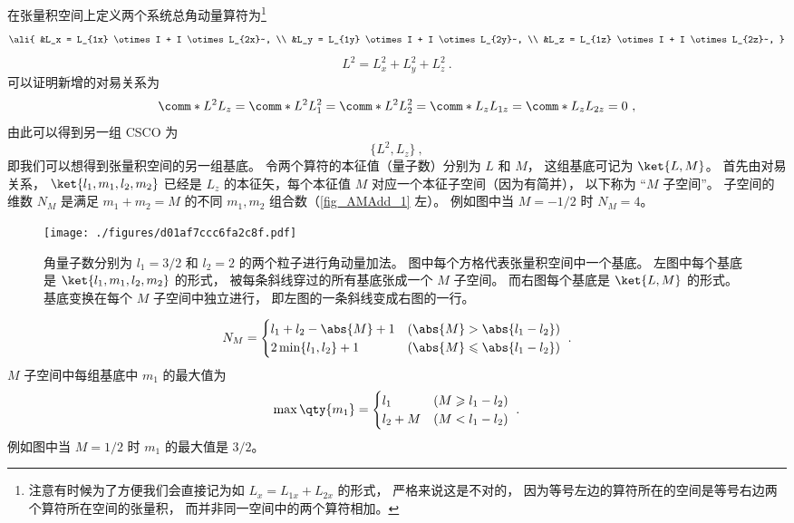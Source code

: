 在张量积空间上定义两个系统总角动量算符为\footnote{注意有时候为了方便我们会直接记为如 $L_x = L_{1x} + L_{2x}$ 的形式， 严格来说这是不对的， 因为等号左边的算符所在的空间是等号右边两个算符所在空间的张量积， 而并非同一空间中的两个算符相加。}
\begin{equation}\ali{
&L_x = L_{1x} \otimes I +  I \otimes L_{2x}~, \\
&L_y = L_{1y} \otimes I +  I \otimes L_{2y}~, \\
&L_z = L_{1z} \otimes I +  I \otimes L_{2z}~,
}\end{equation}
\begin{equation}
L^2 = L_x^2 + L_y^2 + L_z^2~.
\end{equation}
可以证明新增的对易关系为
\begin{equation}
\comm*{L^2}{L_z} = \comm*{L^2}{L_1^2} = \comm*{L^2}{L_2^2} = 
\comm*{L_z}{L_{1z}} = \comm*{L_z}{L_{2z}} = 0~,
\end{equation}
由此可以得到另一组 CSCO 为 %
\begin{equation}
\{L^2, L_z\}~,
\end{equation}
即我们可以想得到张量积空间的另一组基底。 令两个算符的本征值（量子数）分别为 $L$  和 $M$， 这组基底可记为 $\ket{L, M}$。  首先由对易关系， $\ket{l_1, m_1, l_2, m_2}$ 已经是 $L_z$ 的本征矢，每个本征值 $M$ 对应一个本征子空间（因为有简并）， 以下称为 “$M$ 子空间”。 子空间的维数 $N_M$ 是满足 $m_1 + m_2 = M$ 的不同 $m_1,m_2$ 组合数（\autoref{fig_AMAdd_1} 左）。 例如图中当 $M = -1/2$ 时 $N_M = 4$。
\begin{figure}[ht]
\centering
\texttt{[image: ./figures/d01af7ccc6fa2c8f.pdf]}
\caption{角量子数分别为 $l_1 = 3/2$ 和 $l_2 = 2$ 的两个粒子进行角动量加法。 图中每个方格代表张量积空间中一个基底。 左图中每个基底是 $\ket{l_1, m_1, l_2, m_2}$ 的形式， 被每条斜线穿过的所有基底张成一个 $M$ 子空间。 而右图每个基底是 $\ket{L, M}$ 的形式。 基底变换在每个 $M$ 子空间中独立进行， 即左图的一条斜线变成右图的一行。} \label{fig_AMAdd_1}
\end{figure}

\begin{equation}
N_M =
\begin{cases}
l_1 + l_2 - \abs{M} + 1 &(\abs{M} > \abs{l_1 - l_2}) \\
2\min\{l_1, l_2\}  + 1   &(\abs{M} \leqslant\abs{l_1 - l_2})
\end{cases}~.
\end{equation}
$M$ 子空间中每组基底中 $m_1$ 的最大值为
\begin{equation}
\max \qty{m_1} =
\begin{cases}
l_1 \quad &(M \geqslant l_1 - l_2)  \\
l_2 + M &(M < l_1 - l_2)
\end{cases}~.
\end{equation}
例如图中当 $M = 1/2$ 时 $m_1$ 的最大值是 $3/2$。

